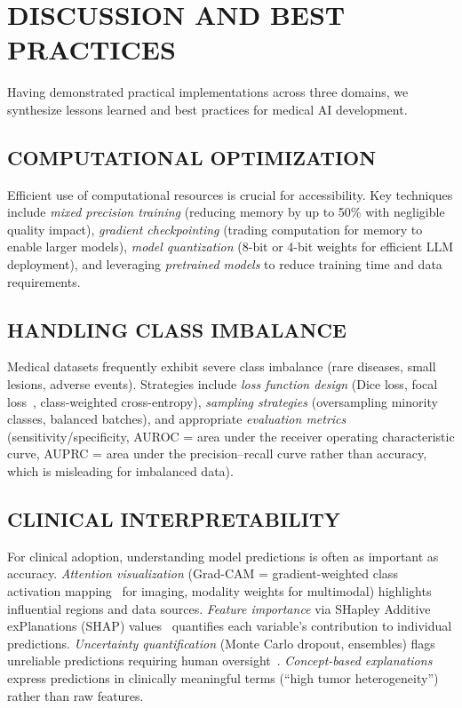 \documentclass[krantz2,ChapterTOCs]{krantz}
\begin{document}
\section{DISCUSSION AND BEST PRACTICES}
\label{sec:discussion}

Having demonstrated practical implementations across three domains, we synthesize lessons learned and best practices for medical AI development.

\subsection{COMPUTATIONAL OPTIMIZATION}

Efficient use of computational resources is crucial for accessibility.
Key techniques include \emph{mixed precision training} (reducing memory by up to 50\% with negligible quality impact), \emph{gradient checkpointing} (trading computation for memory to enable larger models), \emph{model quantization} (8-bit or 4-bit weights for efficient LLM deployment), and leveraging \emph{pretrained models} to reduce training time and data requirements.

\subsection{HANDLING CLASS IMBALANCE}

Medical datasets frequently exhibit severe class imbalance (rare diseases, small lesions, adverse events).
Strategies include \emph{loss function design} (Dice loss, focal loss~\citep{lin2017focal}, class-weighted cross-entropy), \emph{sampling strategies} (oversampling minority classes, balanced batches), and appropriate \emph{evaluation metrics} (sensitivity/specificity, AUROC = area under the receiver operating characteristic curve, AUPRC = area under the precision--recall curve rather than accuracy, which is misleading for imbalanced data).

\subsection{CLINICAL INTERPRETABILITY}

For clinical adoption, understanding model predictions is often as important as accuracy.
\emph{Attention visualization} (Grad-CAM = gradient-weighted class activation mapping~\citep{selvaraju2017grad} for imaging, modality weights for multimodal) highlights influential regions and data sources.
\emph{Feature importance} via SHapley Additive exPlanations (SHAP) values~\citep{lundberg2017shap} quantifies each variable's contribution to individual predictions.
\emph{Uncertainty quantification} (Monte Carlo dropout, ensembles) flags unreliable predictions requiring human oversight~\citep{huang2024uqreview,lopez2025uqsurvey}.
\emph{Concept-based explanations} express predictions in clinically meaningful terms (``high tumor heterogeneity'') rather than raw features.
\end{document}
